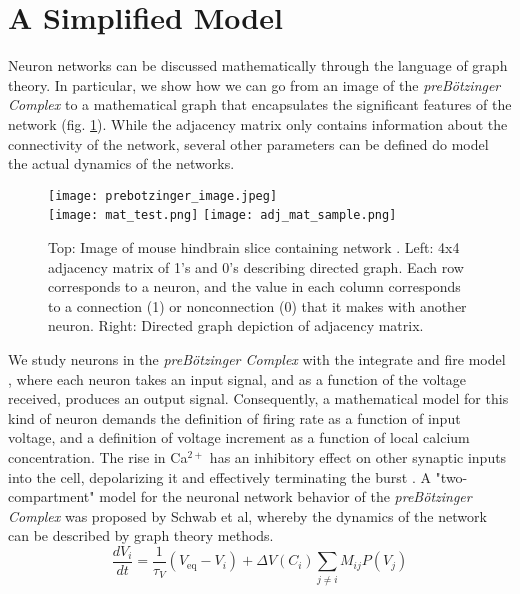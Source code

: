 \documentclass[11pt,letterpaper]{article}
\begin{document}
\section{A Simplified Model}
Neuron networks can be discussed mathematically through the language of graph theory. In particular, we show how we can go from an image of the \textit{preB{\"o}tzinger Complex} to a mathematical graph that encapsulates the significant features of the network (fig. \ref{fig:preBotzinger_anatomy}). While the adjacency matrix only contains information about the connectivity of the network, several other parameters can be defined do model the actual dynamics of the networks.

\begin{figure}[!htb]
	\centering
    	\texttt{[image: prebotzinger\_image.jpeg]}\\
        \texttt{[image: mat\_test.png]}
        \texttt{[image: adj\_mat\_sample.png]}
    \caption{Top: Image of mouse hindbrain slice containing network \cite{preBotzinger_anatomy}. Left: 4x4 adjacency matrix of 1's and 0's describing directed graph. Each row corresponds to a neuron, and the value in each column corresponds to a connection (1) or nonconnection (0) that it makes with another neuron. Right: Directed graph depiction of adjacency matrix.}
    \label{fig:preBotzinger_anatomy}
\end{figure}

We study neurons in the \textit{preB{\"o}tzinger Complex} with the integrate and fire model \cite{koch}, where each neuron takes an input signal, and as a function of the voltage received, produces an output signal. Consequently, a mathematical model for this kind of neuron demands the definition of firing rate as a function of input voltage, and a definition of voltage increment as a function of local calcium concentration. The rise in Ca$^{2+}$ has an inhibitory effect on other synaptic inputs into the cell, depolarizing it and effectively terminating the burst \cite{kcore_paper}. A "two-compartment" model for the neuronal network behavior of the \textit{preB{\"o}tzinger Complex} was proposed by Schwab et al\cite{kcore_paper}, whereby the dynamics of the network can be described by graph theory methods. %
\begin{equation}
\label{eq:voltage_increment}
\frac{dV_i}{dt}=\frac{1}{\tau _V}(V_\text{eq}-V_i) + \Delta V(C_i)\sum _{j \neq i}M_{ij}P(V_j)
\end{equation}
\end{document}
